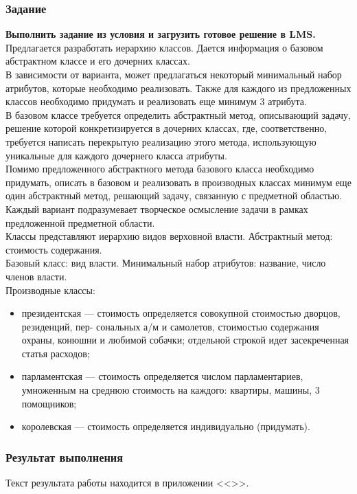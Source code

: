 \documentclass[a4paper,12pt]{article}
\begin{document}
\subsubsection{Задание}
\textbf{Выполнить задание из условия и загрузить готовое решение в LMS.} \medskip\\
Предлагается разработать иерархию классов. Дается информация о базовом
абстрактном классе и его дочерних классах.\\
\indent В зависимости от варианта, может предлагаться некоторый минимальный набор атрибутов, которые необходимо реализовать. Также для каждого из предложенных классов необходимо придумать и реализовать еще минимум 3 атрибута.\\
\indent В базовом классе требуется определить абстрактный метод, описывающий задачу, решение которой конкретизируется в дочерних классах, где, соответственно, требуется написать перекрытую реализацию этого метода, использующую уникальные для каждого дочернего класса атрибуты.\\
\indent Помимо предложенного абстрактного метода базового класса необходимо придумать, описать в
базовом и реализовать в производных классах минимум еще один абстрактный метод, решающий
задачу, связанную с предметной областью.\\
\indent Каждый вариант подразумевает творческое осмысление задачи в рамках предложенной предметной
области. \bigskip\\
Классы представляют иерархию видов верховной власти. Абстрактный метод: стоимость содержания.\\
\indent Базовый класс: вид власти. Минимальный набор атрибутов: название, число членов власти.\medskip\\
Производные классы:
\begin{itemize}
	\item президентская — стоимость определяется совокупной стоимостью дворцов, резиденций, пер-
сональных а/м и самолетов, стоимостью содержания охраны, конюшни и любимой собачки;
отдельной строкой идет засекреченная статья расходов;
	\item парламентская — стоимость определяется числом парламентариев, умноженным на среднюю
стоимость на каждого: квартиры, машины, 3 помощников;
	\item королевская — стоимость определяется индивидуально (придумать).
\end{itemize}
\subsubsection{Результат выполнения}
Текст результата работы находится в приложении <<>>.\\
\end{document}
